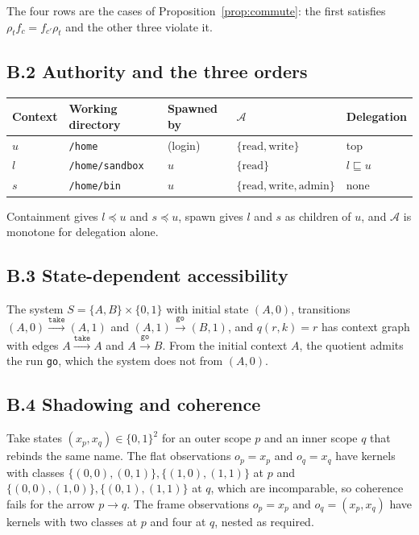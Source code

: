 \documentclass[11pt]{article}
\theoremstyle{definition}
\theoremstyle{remark}
\newcommand{\cA}{\mathcal A}
\begin{document}
The four rows are the cases of Proposition~\ref{prop:commute}: the first satisfies $\rho_tf_c=f_{c'}\rho_t$ and the other three violate it.

\subsection*{B.2 Authority and the three orders}

\begin{center}
\begin{tabular}{lllll}
\toprule
Context & Working directory & Spawned by & $\cA$ & Delegation\\
\midrule
$u$ & \texttt{/home} & (login) & $\{\mathrm{read},\mathrm{write}\}$ & top\\
$l$ & \texttt{/home/sandbox} & $u$ & $\{\mathrm{read}\}$ & $l\sqsubseteq u$\\
$s$ & \texttt{/home/bin} & $u$ & $\{\mathrm{read},\mathrm{write},\mathrm{admin}\}$ & none\\
\bottomrule
\end{tabular}
\end{center}

Containment gives $l\preceq u$ and $s\preceq u$, spawn gives $l$ and $s$ as children of $u$, and $\cA$ is monotone for delegation alone.

\subsection*{B.3 State-dependent accessibility}

The system $S=\{A,B\}\times\{0,1\}$ with initial state $(A,0)$, transitions $(A,0)\xrightarrow{\texttt{take}}(A,1)$ and $(A,1)\xrightarrow{\texttt{go}}(B,1)$, and $q(r,k)=r$ has context graph with edges $A\xrightarrow{\texttt{take}}A$ and $A\xrightarrow{\texttt{go}}B$. From the initial context $A$, the quotient admits the run \texttt{go}, which the system does not from $(A,0)$.

\subsection*{B.4 Shadowing and coherence}

Take states $(x_p,x_q)\in\{0,1\}^2$ for an outer scope $p$ and an inner scope $q$ that rebinds the same name. The flat observations $o_p=x_p$ and $o_q=x_q$ have kernels with classes $\{(0,0),(0,1)\},\{(1,0),(1,1)\}$ at $p$ and $\{(0,0),(1,0)\},\{(0,1),(1,1)\}$ at $q$, which are incomparable, so coherence fails for the arrow $p\to q$. The frame observations $o_p=x_p$ and $o_q=(x_p,x_q)$ have kernels with two classes at $p$ and four at $q$, nested as required.
\end{document}
